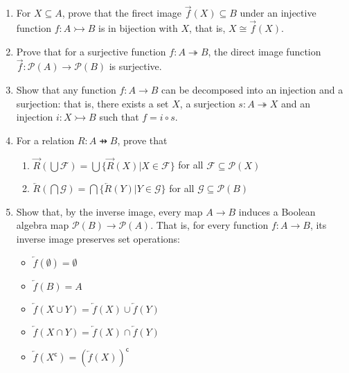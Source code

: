 \documentclass[10pt,\jkfside,a4paper]{article}
\begin{document}
\begin{enumerate}

\item For $X \subseteq A$, prove that the firect image $\overrightarrow{f}(X) \subseteq B$ under an 
injective function $f : A \rightarrowtail B$ is in bijection with $X$, that is, $X \cong \overrightarrow{f}(X)$.



\item Prove that for a surjective function $f: A \twoheadrightarrow B$, the direct image function $\overrightarrow{f}: 
\mathcal{P}(A) \rightarrow \mathcal{P}(B)$ is surjective.



\item Show that any function $f: A \rightarrow B$ can be decomposed into an injection and a surjection: 
that is, there exists a set $X$, a surjection $s: A \twoheadrightarrow X$ and an injection $i: X \rightarrowtail B$ 
such that $f = i \circ s$.



\item For a relation $R: A \pfun B$, prove that

\begin{enumerate}

\item $\overrightarrow{R}(\bigcup \mathcal{F}) = \bigcup \{ \overrightarrow{R}(X) | X \in \mathcal{F}\}$ for all $\mathcal{F} \subseteq \mathcal{P}(X)$



\item $\overleftarrow{R}(\bigcap \mathcal{G}) = \bigcap\{ \overleftarrow{R}(Y) | Y \in \mathcal{G}\}$ for all $\mathcal{G} \subseteq \mathcal{P}(B)$



\end{enumerate}

\item Show that, by the inverse image, every map $A \rightarrow B$ induces a Boolean algebra map $\mathcal{P}(B) \rightarrow \mathcal{P}(A)$. 
That is, for every function $f: A \rightarrow B$, its inverse image preserves set operations:

\begin{itemize}

\item $\overleftarrow{f}(\emptyset) = \emptyset$

\item $\overleftarrow{f}(B) = A$

\item $\overleftarrow{f}(X \cup Y) = \overleftarrow{f}(X) \cup \overleftarrow{f}(Y)$

\item $\overleftarrow{f}(X \cap Y) = \overleftarrow{f}(X) \cap \overleftarrow{f}(Y)$

\item $\overleftarrow{f}(X^\mathsf{c}) = (\overleftarrow{f}(X))^\mathsf{c}$

\end{itemize}

\end{enumerate}
\end{document}
